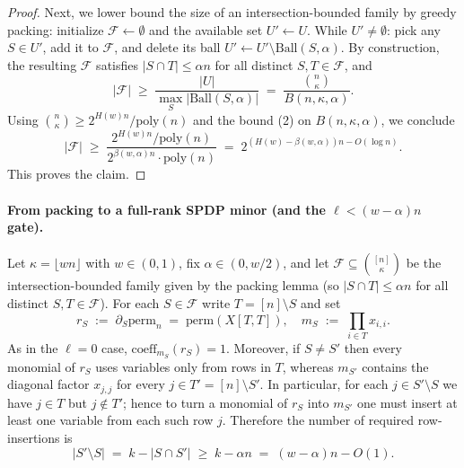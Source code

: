 \documentclass[12pt]{article}
\theoremstyle{definition}
\theoremstyle{definition}
\theoremstyle{remark}
\theoremstyle{remark}
\begin{document}
\begin{proof}
Next, we lower bound the size of an intersection-bounded family by greedy packing: initialize $\mathcal{F} \leftarrow \emptyset$ and the available set $U' \leftarrow U$. While $U' \neq \emptyset$: pick any $S \in U'$, add it to $\mathcal{F}$, and delete its ball $U' \leftarrow U' \setminus \mathrm{Ball}(S,\alpha)$. By construction, the resulting $\mathcal{F}$ satisfies $|S \cap T| \leq \alpha n$ for all distinct $S, T \in \mathcal{F}$, and
\[
|\mathcal{F}| \;\geq\; \frac{|U|}{\max_S |\mathrm{Ball}(S,\alpha)|} \;=\; \frac{\binom{n}{\kappa}}{B(n,\kappa,\alpha)}.
\]
Using $\binom{n}{\kappa} \geq 2^{H(w) n} / \mathrm{poly}(n)$ and the bound (2) on $B(n,\kappa,\alpha)$, we conclude
\[
|\mathcal{F}| \;\geq\; \frac{2^{H(w) n} / \mathrm{poly}(n)}{2^{\beta(w,\alpha) n} \cdot \mathrm{poly}(n)} \;=\; 2^{(H(w) - \beta(w,\alpha))n - O(\log n)}.
\]
This proves the claim.
\end{proof}

\paragraph{From packing to a full-rank SPDP minor (and the $\ell < (w-\alpha)n$ gate).}

Let $\kappa = \lfloor w n \rfloor$ with $w \in (0,1)$, fix $\alpha \in (0, w/2)$, and let $\mathcal{F} \subseteq \binom{[n]}{\kappa}$ be the intersection-bounded family given by the packing lemma (so $|S \cap T| \leq \alpha n$ for all distinct $S, T \in \mathcal{F}$). For each $S \in \mathcal{F}$ write $T = [n] \setminus S$ and set
\[
r_S \;:=\; \partial_S \mathrm{perm}_n \;=\; \mathrm{perm}(X[T,T]), \quad m_S \;:=\; \prod_{i \in T} x_{i,i}.
\]
As in the $\ell = 0$ case, $\mathrm{coeff}_{m_S}(r_S) = 1$. Moreover, if $S \neq S'$ then every monomial of $r_S$ uses variables only from rows in $T$, whereas $m_{S'}$ contains the diagonal factor $x_{j,j}$ for every $j \in T' = [n] \setminus S'$. In particular, for each $j \in S' \setminus S$ we have $j \in T$ but $j \notin T'$; hence to turn a monomial of $r_S$ into $m_{S'}$ one must insert at least one variable from each such row $j$. Therefore the number of required row-insertions is
\[
|S' \setminus S| \;=\; k - |S \cap S'| \;\geq\; k - \alpha n \;=\; (w - \alpha)n - O(1).
\]
\end{document}
